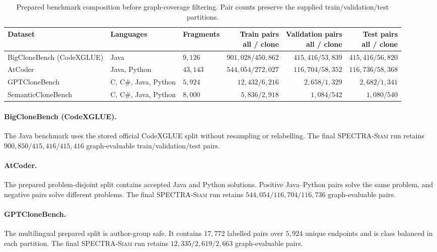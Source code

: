 \documentclass[authoryear,final,5p,times,twocolumn]{elsarticle}
\newcommand{\method}{\textsc{SPECTRA-Siam}}
\theoremstyle{plain}
\begin{document}
\begin{table}[t]
\centering
\caption{Prepared benchmark composition before graph-coverage filtering. Pair
counts preserve the supplied train/validation/test partitions.}
\label{tab:datasets}
\small
\renewcommand{\arraystretch}{1.12}
\begin{tabular}{lllrrr}
\toprule
Dataset & Languages & Fragments & \shortstack{Train pairs\\all / clone} &
\shortstack{Validation pairs\\all / clone} & \shortstack{Test pairs\\all / clone} \\
\midrule
BigCloneBench (CodeXGLUE) & Java & $9{,}126$ & $901{,}028 / 450{,}862$ & $415{,}416 / 53{,}839$ & $415{,}416 / 56{,}820$ \\
AtCoder & Java, Python & $43{,}143$ & $544{,}054 / 272{,}027$ & $116{,}704 / 58{,}352$ & $116{,}736 / 58{,}368$ \\
GPTCloneBench & C, C\#, Java, Python & $5{,}924$ & $12{,}432 / 6{,}216$ & $2{,}658 / 1{,}329$ & $2{,}682 / 1{,}341$ \\
SemanticCloneBench & C, C\#, Java, Python & $8{,}000$ & $5{,}836 / 2{,}918$ & $1{,}084 / 542$ & $1{,}080 / 540$ \\
\bottomrule
\end{tabular}
\end{table}

\paragraph{BigCloneBench (CodeXGLUE).}
The Java benchmark uses the stored official CodeXGLUE split without resampling
or relabelling. The final \method{} run retains
$900{,}850/415{,}416/415{,}416$ graph-evaluable train/validation/test pairs.

\paragraph{AtCoder.}
The prepared problem-disjoint split contains accepted Java and Python
solutions. Positive Java--Python pairs solve the same problem, and negative
pairs solve different problems. The final \method{} run retains
$544{,}054/116{,}704/116{,}736$ graph-evaluable pairs.

\paragraph{GPTCloneBench.}
The multilingual prepared split is author-group safe. It contains
$17{,}772$ labelled pairs over $5{,}924$ unique endpoints and is class
balanced in each partition. The final \method{} run retains
$12{,}335/2{,}619/2{,}663$ graph-evaluable pairs.
\end{document}
